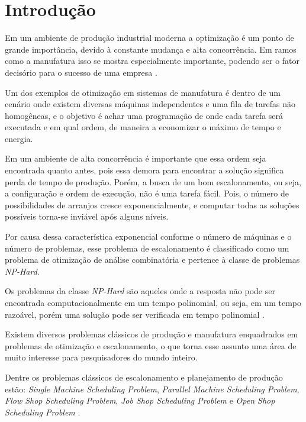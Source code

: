 
\chapter{Introdução}
    Em um ambiente de produção industrial moderna a optimização é um ponto de grande importância, devido à constante mudança e alta concorrência. Em ramos como a manufatura isso se mostra especialmente importante, podendo ser o fator decisório para o sucesso de uma empresa \cite{Wari2016}.\hfill  
    
    Um dos exemplos de otimização em sistemas de manufatura é dentro de um cenário onde existem diversas máquinas independentes e uma fila de tarefas não homogêneas, e o objetivo é achar uma programação de onde cada tarefa será executada e em qual ordem, de maneira a economizar o máximo de tempo e energia.\newline

    Em um ambiente de alta concorrência é importante que essa ordem seja encontrada quanto antes, pois essa demora para encontrar a solução significa perda de tempo de produção. Porém, a busca de um bom escalonamento, ou seja, a configuração e ordem de execução, não é uma tarefa fácil. Pois, o número de possibilidades de arranjos cresce exponencialmente, e computar todas as soluções possíveis torna-se inviável após alguns níveis. \newline

    Por causa dessa característica exponencial conforme o número de máquinas e o número de problemas, esse problema de escalonamento é classificado como um problema de otimização de análise combinatória e pertence à classe de problemas \textit{NP-Hard}. \newline

    Os problemas da classe \textit{NP-Hard} são aqueles onde a resposta não pode ser encontrada computacionalmente em um tempo polinomial, ou seja, em um tempo razoável, porém uma solução pode ser verificada em tempo polinomial \cite{Eswaramurthy2008}.\newline

    Existem diversos problemas clássicos de produção e manufatura enquadrados em problemas de otimização e escalonamento, o que torna esse assunto uma área de muito interesse para pesquisadores do mundo inteiro.\newline

    Dentre os problemas clássicos de escalonamento e planejamento de produção estão: 
    \textit{Single Machine Scheduling Problem}, 
    \textit{Parallel Machine Scheduling Problem}, 
    \textit{Flow Shop Scheduling Problem}, 
    \textit{Job Shop Scheduling Problem} e 
    \textit{Open Shop Scheduling Problem} 
    \cite{Allahverdi2008}.\newline

